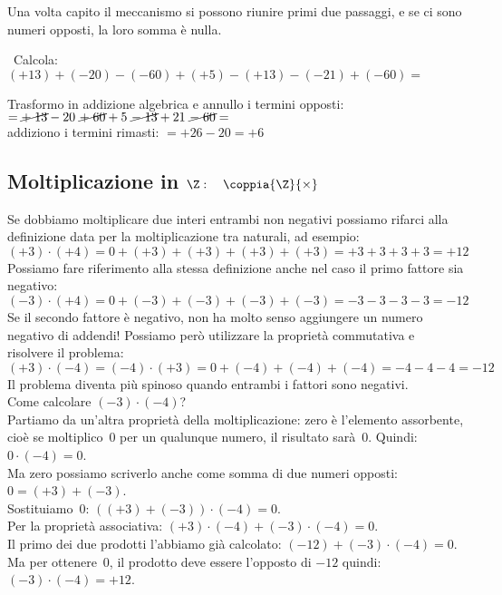 Una volta capito il meccanismo si possono riunire primi due passaggi, 
e se ci sono numeri opposti, la loro somma è nulla.

\begin{esempio}{}{}
~Calcola: \((+13)+(-20)-(-60)+(+5)-(+13)-(-21)+(-60)=\) 

Trasformo in addizione algebrica e annullo i termini opposti:\\
\(=\cancel{+\;13}-20~\cancel{+\;60}+5~\cancel{-\;13}+21~\cancel{-\;60}=\)\\
addiziono i termini rimasti:\hspace{15.3mm}
\(= +26 - 20 = +6\)
\end{esempio}


\subsection{Moltiplicazione in $\Z: \quad \coppia{\Z}{\times}$}

Se dobbiamo moltiplicare due interi entrambi non negativi possiamo rifarci 
alla definizione data per la moltiplicazione tra naturali, ad esempio:
\[(+3) \cdot (+4) = 0 + (+3) + (+3) + (+3) + (+3) = +3+3+3+3 = +12\]
Possiamo fare riferimento alla stessa definizione anche nel caso il primo 
fattore sia negativo:
\[(-3) \cdot (+4) = 0 + (-3) + (-3) + (-3) + (-3) = -3-3-3-3 = -12\]
Se il secondo fattore è negativo, non ha molto senso aggiungere un numero 
negativo di addendi!
Possiamo però utilizzare la proprietà commutativa e risolvere il problema:
\[(+3) \cdot (-4) = (-4) \cdot (+3) = 
  0 + (-4) + (-4) + (-4) = -4-4-4 = -12\]
Il problema diventa più spinoso quando entrambi i fattori sono negativi.\\
Come calcolare \((-3) \cdot (-4)\)?\\
Partiamo da un'altra proprietà della moltiplicazione: zero è l'elemento 
assorbente, cioè se moltiplico~0 per un qualunque numero, il risultato 
sarà~0.
Quindi: \quad \(0 \cdot (-4) = 0\).\\
Ma zero possiamo scriverlo anche come somma di due numeri opposti: \quad 
\(0 = (+3) + (-3)\).\\
Sostituiamo~0: \quad \(((+3) + (-3)) \cdot (-4) = 0\).\\
Per la proprietà associativa: \quad 
\((+3) \cdot (-4) + (-3) \cdot (-4) = 0\).\\
Il primo dei due prodotti l'abbiamo già calcolato: \quad 
\((-12) + (-3) \cdot (-4) = 0\).\\
Ma per ottenere~0, il prodotto deve essere l'opposto di \(-12\) quindi: 
\quad \((-3) \cdot (-4) = +12\).

